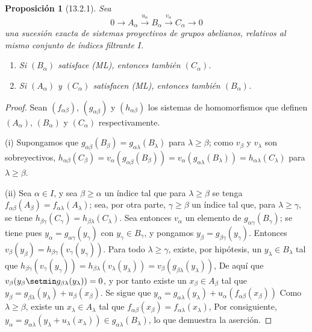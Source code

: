 \documentclass[10pt,oneside,openany]{book}
\theoremstyle{egaenv}\newtheorem*{env}{---}
\theoremstyle{egastatement}
\newtheorem*{proposition}{Proposición}
\theoremstyle{egadescription}
\newcommand{\oldpage}[2][]{\marginnote{\normalfont\scriptsize\textbf{#1}\,|\,#2}\ignorespaces}
\renewcommand{\geq}{\geqslant}
\begin{document}
\begin{proposition}[13.2.1]
\label{0.13.2.1}
\label{0.13.2.1-fr}
Sea
\[
0\longrightarrow A_\alpha\xrightarrow{u_\alpha}B_\alpha
\xrightarrow{v_\alpha}C_\alpha\longrightarrow0
\]
una sucesión exacta de sistemas proyectivos de grupos abelianos, relativos
al mismo conjunto de índices filtrante $I$.
\begin{enumerate}
  \item[{\rm(i)}]
  Si $(B_\alpha)$ satisface {\rm(ML)}, entonces también $(C_\alpha)$.
  \item[{\rm(ii)}]
  Si $(A_\alpha)$ y $(C_\alpha)$ satisfacen {\rm(ML)}, entonces también
  $(B_\alpha)$.
\end{enumerate}
\end{proposition}

\begin{proof}
Sean $(f_{\alpha\beta})$, $(g_{\alpha\beta})$ y
$(h_{\alpha\beta})$ los sistemas de homomorfismos que definen
$(A_\alpha)$, $(B_\alpha)$ y $(C_\alpha)$ respectivamente.

(i) Supongamos que $g_{\alpha\beta}(B_\beta)=g_{\alpha\lambda}(B_\lambda)$ para $\lambda\geq\beta$; como $v_\beta$ y $v_\lambda$ son sobreyectivos,
$h_{\alpha\beta}(C_\beta)=v_\alpha(g_{\alpha\beta}(B_\beta))=v_\alpha(g_{\alpha\lambda}(B_\lambda))=h_{\alpha\lambda}(C_\lambda)$
para $\lambda\geq\beta$.

(ii) Sea $\alpha\in I$, y sea $\beta\geq\alpha$ un índice tal que para $\lambda\geq\beta$ se tenga $f_{\alpha\beta}(A_\beta)=f_{\alpha\lambda}(A_\lambda)$; sea, por otra parte, $\gamma\geq\beta$ un índice tal que, para $\lambda\geq\gamma$, se tiene
$h_{\beta\gamma}(C_\gamma)=h_{\beta\lambda}(C_\lambda)$. Sea entonces
$v_\alpha$ un elemento de $g_{\alpha\gamma}(B_\gamma)$; se tiene pues
$y_\alpha=g_{\alpha\gamma}(y_\gamma)$ con $y_\gamma\in B_\gamma$,
y pongamos $y_\beta=g_{\beta\gamma}(y_\gamma)$.
Entonces
$v_\beta(y_\beta)=h_{\beta\gamma}(v_\gamma(y_\gamma))$.
Para todo $\lambda\geq\gamma$, existe, por hipótesis, un
$y_\lambda\in B_\lambda$ tal que
$h_{\beta\gamma}(v_\gamma(y_\gamma))
=h_{\beta\lambda}(v_\lambda(y_\lambda))
=v_\beta(g_{\beta\lambda}(y_\lambda))$,
De aquí que
$v_\beta(y_\beta\setmin g_{\beta\lambda}(y_\lambda))=0$, y por tanto
existe un $x_\beta\in A_\beta$
\oldpage[0\textsubscript{III}]{66}
tal que
$y_\beta=g_{\beta\lambda}(y_\lambda)+u_\beta(x_\beta)$.
Se sigue que
$y_\alpha=g_{\alpha\lambda}(y_\lambda)+u_\alpha(f_{\alpha\beta}(x_\beta))$
Como $\lambda\geq\beta$, existe un $x_\lambda\in A_\lambda$ tal
que
$f_{\alpha\beta}(x_\beta)=f_{\alpha\lambda}(x_\lambda)$,
Por consiguiente,
$y_\alpha=g_{\alpha\lambda}(y_\lambda+u_\lambda(x_\lambda))\in g_{\alpha\lambda}(B_\lambda)$,
lo que demuestra la aserción.
\end{proof}
\end{document}

